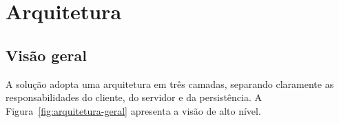 
\chapter{Arquitetura}
\label{cap:arquitetura}

%
%


\section{Visão geral}
\label{sec:arquitetura-geral}


A solução adopta uma arquitetura em três camadas, separando
claramente as responsabilidades do cliente, do servidor e da
persistência. A Figura~\ref{fig:arquitetura-geral} apresenta a
visão de alto nível.

